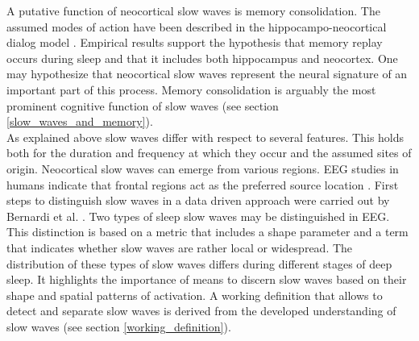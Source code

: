 A putative function of neocortical slow waves is memory consolidation. The assumed modes of action have been described in the hippocampo-neocortical dialog model \parencite{buzsaki1996hippocampo}. Empirical results support the hypothesis that memory replay occurs during sleep and that it includes both hippocampus and neocortex. One may hypothesize that neocortical slow waves represent the neural signature of an important part of this process. Memory consolidation is arguably the most prominent cognitive function of slow waves (see section \ref{slow_waves_and_memory}).\\
As explained above slow waves differ with respect to several features. This holds both for the duration and frequency at which they occur and the assumed sites of origin. Neocortical slow waves can emerge from various regions. EEG studies in humans indicate that frontal regions act as the preferred source location \parencite[p. 1110]{brown2012control}. First steps to distinguish slow waves in a data driven approach were carried out by Bernardi et al. \parencite*{bernardi2018local}. Two types of sleep slow waves may be distinguished in EEG. This distinction is based on a metric that includes a shape parameter and a term that indicates whether slow waves are rather local or widespread. The distribution of these types of slow waves differs during different stages of deep sleep. It highlights the importance of means to discern slow waves based on their shape and spatial patterns of activation. A working definition that allows to detect and separate slow waves is derived from the developed understanding of slow waves (see section \ref{working_definition}).


